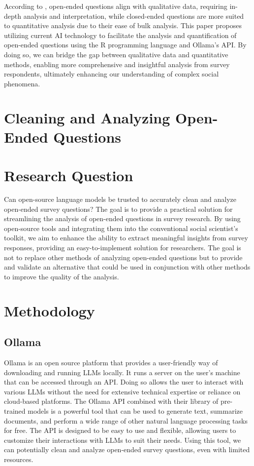 \documentclass[
  authoryear,
  preprint,
  3p]{elsarticle}
\begin{document}
According to \citet{bickman_rog09}, open-ended questions align with
qualitative data, requiring in-depth analysis and interpretation, while
closed-ended questions are more suited to quantitative analysis due to
their ease of bulk analysis. This paper proposes utilizing current AI
technology to facilitate the analysis and quantification of open-ended
questions using the R programming language and Ollama's API. By doing
so, we can bridge the gap between qualitative data and quantitative
methods, enabling more comprehensive and insightful analysis from survey
respondents, ultimately enhancing our understanding of complex social
phenomena.

\section{Cleaning and Analyzing Open-Ended
Questions}\label{cleaning-and-analyzing-open-ended-questions}

\section{Research Question}\label{research-question}

Can open-source language models be trusted to accurately clean and
analyze open-ended survey questions? The goal is to provide a practical
solution for streamlining the analysis of open-ended questions in survey
research. By using open-source tools and integrating them into the
conventional social scientist's toolkit, we aim to enhance the ability
to extract meaningful insights from survey responses, providing an
easy-to-implement solution for researchers. The goal is not to replace
other methods of analyzing open-ended questions but to provide and
validate an alternative that could be used in conjunction with other
methods to improve the quality of the analysis.

\section{Methodology}\label{methodology}

\subsection{Ollama}\label{ollama}

Ollama is an open source platform that provides a user-friendly way of
downloading and running LLMs locally. It runs a server on the user's
machine that can be accessed through an API. Doing so allows the user to
interact with various LLMs without the need for extensive technical
expertise or reliance on cloud-based platforms. The Ollama API combined
with their library of pre-trained models is a powerful tool that can be
used to generate text, summarize documents, and perform a wide range of
other natural language processing tasks for free. The API is designed to
be easy to use and flexible, allowing users to customize their
interactions with LLMs to suit their needs. Using this tool, we can
potentially clean and analyze open-ended survey questions, even with
limited resources.
\end{document}
